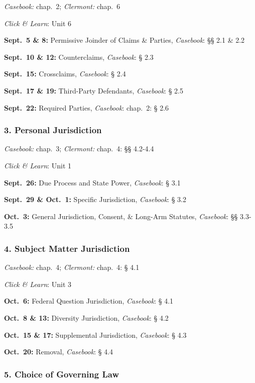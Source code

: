 \documentclass[11pt,letterpaper,twoside]{article}
\begin{document}
\emph{Casebook:} chap.~2; \emph{Clermont:} chap.~6

\emph{Click \& Learn}: Unit 6

\textbf{Sept.~5 \& 8:} Permissive Joinder of Claims \& Parties,
\emph{Casebook}: §§ 2.1 \& 2.2

\textbf{Sept.~10 \& 12:} Counterclaims, \emph{Casebook}: § 2.3

\textbf{Sept.~15:} Crossclaims, \emph{Casebook}: § 2.4

\textbf{Sept.~17 \& 19:} Third-Party Defendants, \emph{Casebook}: § 2.5

\textbf{Sept.~22:} Required Parties, \emph{Casebook}: chap.~2: § 2.6

\subsubsection{3. Personal Jurisdiction}\label{personal-jurisdiction}

\emph{Casebook:} chap.~3; \emph{Clermont:} chap.~4: §§ 4.2-4.4

\emph{Click \& Learn}: Unit 1

\textbf{Sept.~26:} Due Process and State Power, \emph{Casebook}: § 3.1

\textbf{Sept.~29 \& Oct.~1:} Specific Jurisdiction, \emph{Casebook}: §
3.2

\textbf{Oct.~3:} General Jurisdiction, Consent, \& Long-Arm Statutes,
\emph{Casebook}: §§ 3.3-3.5

\subsubsection{4. Subject Matter
Jurisdiction}\label{subject-matter-jurisdiction}

\emph{Casebook:} chap.~4; \emph{Clermont:} chap.~4: § 4.1

\emph{Click \& Learn}: Unit 3

\textbf{Oct.~6:} Federal Question Jurisdiction, \emph{Casebook}: § 4.1

\textbf{Oct.~8 \& 13:} Diversity Jurisdiction, \emph{Casebook}: § 4.2

\textbf{Oct.~15 \& 17:} Supplemental Jurisdiction, \emph{Casebook}: §
4.3

\textbf{Oct.~20:} Removal, \emph{Casebook}: § 4.4

\subsubsection{5. Choice of Governing
Law}\label{choice-of-governing-law}
\end{document}
